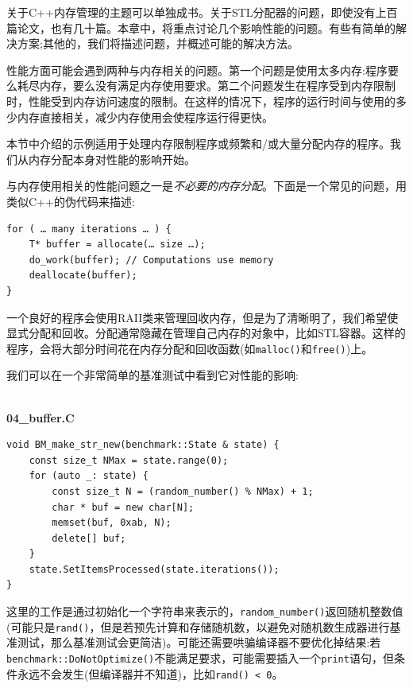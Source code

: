 
关于C++内存管理的主题可以单独成书。关于STL分配器的问题，即使没有上百篇论文，也有几十篇。本章中，将重点讨论几个影响性能的问题。有些有简单的解决方案;其他的，我们将描述问题，并概述可能的解决方法。 

性能方面可能会遇到两种与内存相关的问题。第一个问题是使用太多内存:程序要么耗尽内存，要么没有满足内存使用要求。第二个问题发生在程序受到内存限制时，性能受到内存访问速度的限制。在这样的情况下，程序的运行时间与使用的多少内存直接相关，减少内存使用会使程序运行得更快。 

本节中介绍的示例适用于处理内存限制程序或频繁和/或大量分配内存的程序。我们从内存分配本身对性能的影响开始。


与内存使用相关的性能问题之一是\textit{不必要的内存分配}。下面是一个常见的问题，用类似C++的伪代码来描述:

\begin{lstlisting}[style=styleCXX]
for ( … many iterations … ) {
	T* buffer = allocate(… size …);
	do_work(buffer); // Computations use memory
	deallocate(buffer);
}
\end{lstlisting}

一个良好的程序会使用RAII类来管理回收内存，但是为了清晰明了，我们希望使显式分配和回收。分配通常隐藏在管理自己内存的对象中，比如STL容器。这样的程序，会将大部分时间花在内存分配和回收函数(如\texttt{malloc()}和\texttt{free()})上。 

我们可以在一个非常简单的基准测试中看到它对性能的影响:

\hspace*{\fill} \\ %
\noindent
\textbf{04\_buffer.C}
\begin{lstlisting}[style=styleCXX]
void BM_make_str_new(benchmark::State & state) {
	const size_t NMax = state.range(0);
	for (auto _: state) {
		const size_t N = (random_number() % NMax) + 1;
		char * buf = new char[N];
		memset(buf, 0xab, N);
		delete[] buf;
	}
	state.SetItemsProcessed(state.iterations());
}
\end{lstlisting}

这里的工作是通过初始化一个字符串来表示的，\texttt{random\_number()}返回随机整数值(可能只是\texttt{rand()}，但是若预先计算和存储随机数，以避免对随机数生成器进行基准测试，那么基准测试会更简洁)。可能还需要哄骗编译器不要优化掉结果:若\texttt{benchmark::DoNotOptimize()}不能满足要求，可能需要插入一个\texttt{print}语句，但条件永远不会发生(但编译器并不知道)，比如\texttt{rand() < 0}。

